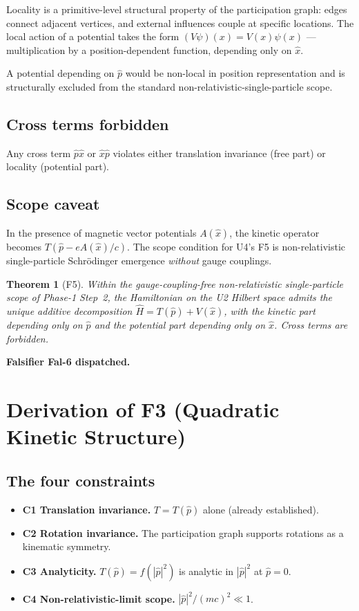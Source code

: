 \documentclass[11pt,a4paper]{article}
\newtheorem{theorem}{Theorem}[section]
\begin{document}
Locality is a primitive-level structural property of the participation graph: edges connect adjacent vertices, and external influences couple at specific locations. The local action of a potential takes the form $(V \psi)(x) = V(x) \psi(x)$ --- multiplication by a position-dependent function, depending only on $\hat{x}$.

A potential depending on $\hat{p}$ would be non-local in position representation and is structurally excluded from the standard non-relativistic-single-particle scope.

\subsection{Cross terms forbidden}

Any cross term $\hat{p} \hat{x}$ or $\hat{x} \hat{p}$ violates either translation invariance (free part) or locality (potential part).

\subsection{Scope caveat}

In the presence of magnetic vector potentials $A(\hat{x})$, the kinetic operator becomes $T(\hat{p} - e A(\hat{x})/c)$. The scope condition for U4's F5 is non-relativistic single-particle Schr\"odinger emergence \emph{without} gauge couplings.

\begin{theorem}[F5]
Within the gauge-coupling-free non-relativistic single-particle scope of Phase-1 Step~2, the Hamiltonian on the U2 Hilbert space admits the unique additive decomposition $\hat{H} = T(\hat{p}) + V(\hat{x})$, with the kinetic part depending only on $\hat{p}$ and the potential part depending only on $\hat{x}$. Cross terms are forbidden.
\end{theorem}

\textbf{Falsifier Fal-6 dispatched.}

\section{Derivation of F3 (Quadratic Kinetic Structure)}\label{sec:F3}

\subsection{The four constraints}

\begin{itemize}
  \item \textbf{C1 Translation invariance.} $T = T(\hat{p})$ alone (already established).
  \item \textbf{C2 Rotation invariance.} The participation graph supports rotations as a kinematic symmetry.
  \item \textbf{C3 Analyticity.} $T(\hat{p}) = f(|\hat{p}|^2)$ is analytic in $|\hat{p}|^2$ at $\hat{p} = 0$.
  \item \textbf{C4 Non-relativistic-limit scope.} $|\hat{p}|^2 / (mc)^2 \ll 1$.
\end{itemize}
\end{document}
